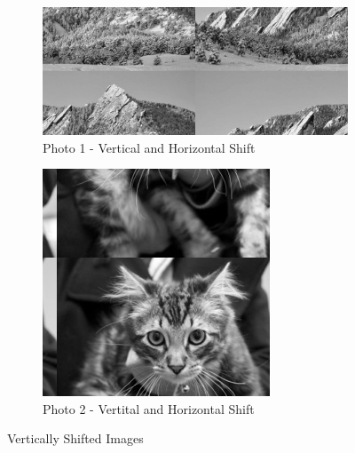 \documentclass[10pt]{report}
\begin{document}

\begin{figure}[ht]
    \centering
    \begin{subfigure}{\textwidth}
        \centering
        \includegraphics[scale=0.7]{./img/vhsg1.png}
        \caption{Photo 1 - Vertical and Horizontal Shift}
        \label{fig:p1vg}
    \end{subfigure}
    \begin{subfigure}{\textwidth}
        \centering
        \includegraphics[scale=0.7]{./img/vhsg2.png}
        \caption{Photo 2 - Vertital and Horizontal Shift}
        \label{fig:p2vg}
    \end{subfigure}
    \caption{Vertically Shifted Images}
    \label{fig:vs_images}
\end{figure}
\newpage









\end{document}
